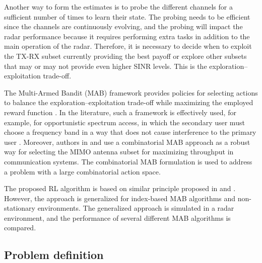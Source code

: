 \documentclass[english, 12pt, a4paper, elec, utf8, a-1b, online]{aaltothesis}
\numberwithin{equation}{section}
\begin{document}
Another way to form the estimates is to probe the different channels for a sufficient number of times to learn their state.
The probing needs to be efficient since the channels are continuously evolving, and the probing will impact the radar performance because it requires performing extra tasks in addition to the main operation of the radar.  Therefore, it is necessary to decide when to exploit the TX-RX subset currently providing the best payoff or explore other subsets that may or may not provide even higher SINR levels. 
This is the exploration--exploitation trade-off.

The Multi-Armed Bandit (MAB) framework provides policies for selecting actions to balance the exploration--exploitation trade-off while maximizing the employed reward function \cite{Lattimore2019}.
In the literature, such a framework is effectively used, for example, for opportunistic spectrum access, in which the secondary user must choose a frequency band in a way that does not cause interference to the primary user \cite{Zhao2008}.
Moreover, authors in \cite{Mukherjee2012} and \cite{Kuai2019} use a combinatorial MAB approach as a robust way for selecting the MIMO antenna subset for maximizing throughput in communication systems.
The combinatorial MAB formulation is used to address a problem with a large combinatorial action space.


The proposed RL algorithm is based on similar principle proposed in \cite{Mukherjee2012} and \cite{Kuai2019}. 
However, the approach is generalized for index-based MAB algorithms and non-stationary environments. 
The generalized approach is simulated in a radar environment, and the performance of several different MAB algorithms is compared.


\subsection{Problem definition}

\newcommand{\ntx}{{N_{\text{tx}}}}
\newcommand{\nrx}{{N_{\text{rx}}}}
\newcommand{\srx}{{M_{\text{rx}}}}
\newcommand{\stx}{{M_{\text{tx}}}}
\end{document}
